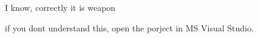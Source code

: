 I know, correctly it is {\ttfamily weapon}

if you don\textquotesingle{}t understand this, open the porject in MS Visual Studio. 
